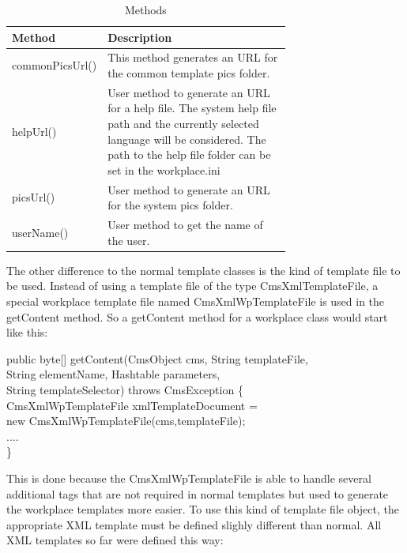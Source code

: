 \begin{table}
\begin{center}
\begin{tabular}{|l|p{0.70\linewidth}|}
\hline
{\bf Method}&
{\bf Description}\\ \hline
commonPicsUrl()&
This method generates an URL for the common template pics folder.\\ \hline
helpUrl()&
User method to generate an URL for a help file. The
system help file path and the currently selected language will be
considered. The path to the help file folder can be set in the
workplace.ini \\ \hline
picsUrl()&
User method to generate an URL for the system pics folder. \\ \hline
userName()&
User method to get the name of the user.\\ \hline
\end{tabular}
\caption[Methods]{Methods}
\label{CmsWPClass}
\end{center} 
\end{table}


The other difference to the normal template classes is the kind of
template file to be used.  Instead of using a template file of the type
CmsXmlTemplateFile, a special workplace template file named
CmsXmlWpTemplateFile is used in the getContent method.  So a getContent
method for a workplace class would start like this:

\begin{java}
public byte[] getContent(CmsObject cms, String templateFile,\\
\jtabd  String elementName, Hashtable parameters,\\
\jtabd  String templateSelector) throws CmsException \{\\
\jtabe      CmsXmlWpTemplateFile xmlTemplateDocument =\\
\jtabe      new CmsXmlWpTemplateFile(cms,templateFile);\\
....\\
\}\\
\end{java}

This is done because the {\name CmsXmlWpTemplateFile} is able to handle several
additional tags that are not required in normal templates but used to
generate the workplace templates more easier. To use this kind of
template file object, the appropriate XML template must be defined
slighly different than normal. All XML templates so far were defined
this way:

